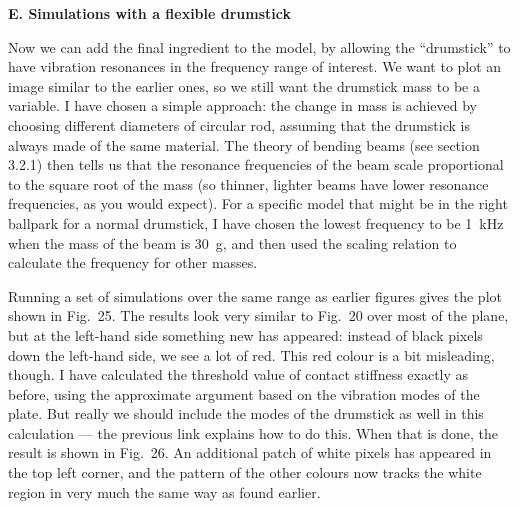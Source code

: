   \textbf{E. Simulations with a flexible drumstick} 

  Now we can add the final ingredient to the model, by allowing the “drumstick” 
  to have vibration resonances in the frequency range of interest. We want to 
  plot an image similar to the earlier ones, so we still want the drumstick 
  mass to be a variable. I have chosen a simple approach: the change in mass is 
  achieved by choosing different diameters of circular rod, assuming that the 
  drumstick is always made of the same material. The theory of bending beams 
  (see section 3.2.1) then tells us that the resonance frequencies of the beam 
  scale proportional to the square root of the mass (so thinner, lighter beams 
  have lower resonance frequencies, as you would expect). For a specific model 
  that might be in the right ballpark for a normal drumstick, I have chosen the 
  lowest frequency to be 1~kHz when the mass of the beam is 30~g, and then used 
  the scaling relation to calculate the frequency for other masses. 

  Running a set of simulations over the same range as earlier figures gives the 
  plot shown in Fig.\ 25. The results look very similar to Fig.\ 20 over most 
  of the plane, but at the left-hand side something new has appeared: instead 
  of black pixels down the left-hand side, we see a lot of red. This red colour 
  is a bit misleading, though. I have calculated the threshold value of contact 
  stiffness exactly as before, using the approximate argument based on the 
  vibration modes of the plate. But really we should include the modes of the 
  drumstick as well in this calculation — the previous link explains how to do 
  this. When that is done, the result is shown in Fig.\ 26. An additional patch 
  of white pixels has appeared in the top left corner, and the pattern of the 
  other colours now tracks the white region in very much the same way as found 
  earlier. 


